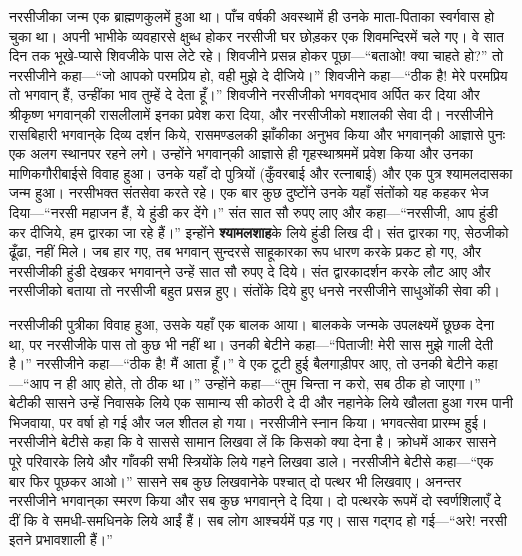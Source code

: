 \begin{sloppypar}\justifying{}
नरसीजीका जन्म एक ब्राह्मण\-कुलमें हुआ था। पाँच वर्षकी अवस्थामें ही उनके माता-पिताका स्वर्गवास हो चुका था। अपनी भाभीके व्यवहारसे क्षुब्ध होकर नरसीजी घर छोड़कर एक शिव\-मन्दिरमें चले गए। वे सात दिन तक भूखे-प्यासे शिवजीके पास लेटे रहे। शिवजीने प्रसन्न होकर पूछा—“बताओ! क्या चाहते हो?” तो नरसीजीने कहा—“जो आपको परमप्रिय हो, वही मुझे दे दीजिये।” शिवजीने कहा—“ठीक है! मेरे परमप्रिय तो भगवान् हैं, उन्हींका भाव तुम्हें दे देता हूँ।” शिवजीने नरसीजीको भगवद्भाव अर्पित कर दिया और श्रीकृष्ण भगवान्‌की रासलीलामें इनका प्रवेश करा दिया, और नरसीजीको मशालकी सेवा दी। नरसीजीने रासबिहारी भगवान्‌के दिव्य दर्शन किये, रासमण्डलकी झाँकीका अनुभव किया और भगवान्‌की आज्ञासे पुनः एक अलग स्थानपर रहने लगे। उन्होंने भगवान्‌की आज्ञासे ही गृहस्थाश्रममें प्रवेश किया और उनका माणिक\-गौरी\-बाईसे विवाह हुआ। उनके यहाँ दो पुत्रियों (कुँवरबाई और रत्नाबाई) और एक पुत्र श्यामलदासका जन्म हुआ। नरसीभक्त संतसेवा करते रहे। एक बार कुछ दुष्टोंने उनके यहाँ संतोंको यह कहकर भेज दिया—“नरसी महाजन हैं, ये हुंडी कर देंगे।” संत सात सौ रुपए लाए और कहा—“नरसीजी, आप हुंडी कर दीजिये, हम द्वारका जा रहे हैं।” इन्होंने \textbf{श्यामलशाह}के लिये हुंडी लिख दी। संत द्वारका गए, सेठजीको ढूँढा, नहीं मिले। जब हार गए, तब भगवान् सुन्दरसे साहूकारका रूप धारण करके प्रकट हो गए, और नरसीजीकी हुंडी देखकर भगवान्‌ने उन्हें सात सौ रुपए दे दिये। संत द्वारका\-दर्शन करके लौट आए और नरसीजीको बताया तो नरसीजी बहुत प्रसन्न हुए। संतोंके दिये हुए धनसे नरसीजीने साधुओंकी सेवा की।
\end{sloppypar}
\begin{sloppypar}\justifying{}
नरसीजीकी पुत्रीका विवाह हुआ, उसके यहाँ एक बालक आया। बालकके जन्मके उपलक्ष्यमें छूछक देना था, पर नरसीजीके पास तो कुछ भी नहीं था। उनकी बेटीने कहा—“पिताजी! मेरी सास मुझे गाली देती है।” नरसीजीने कहा—“ठीक है! मैं आता हूँ।” वे एक टूटी हुई बैलगाड़ीपर आए, तो उनकी बेटीने कहा—“आप न ही आए होते, तो ठीक था।” उन्होंने कहा—“तुम चिन्ता न करो, सब ठीक हो जाएगा।” बेटीकी सासने उन्हें निवासके लिये एक सामान्य सी कोठरी दे दी और नहानेके लिये खौलता हुआ गरम पानी भिजवाया, पर वर्षा हो गई और जल शीतल हो गया। नरसीजीने स्नान किया। भगवत्सेवा प्रारम्भ हुई। नरसीजीने बेटीसे कहा कि वे साससे सामान लिखवा लें कि किसको क्या देना है। क्रोधमें आकर सासने पूरे परिवारके लिये और गाँवकी सभी स्त्रियोंके लिये गहने लिखवा डाले। नरसीजीने बेटीसे कहा—“एक बार फिर पूछकर आओ।” सासने सब कुछ लिखवानेके पश्चात् दो पत्थर भी लिखवाए। अनन्तर नरसीजीने भगवान्‌का स्मरण किया और सब कुछ भगवान्‌ने दे दिया। दो पत्थरके रूपमें दो स्वर्ण\-शिलाएँ दे दीं कि वे समधी-समधिनके लिये आईं हैं। सब लोग आश्चर्यमें पड़ गए। सास गद्गद हो गई—“अरे! नरसी इतने प्रभावशाली हैं।”
\end{sloppypar}
